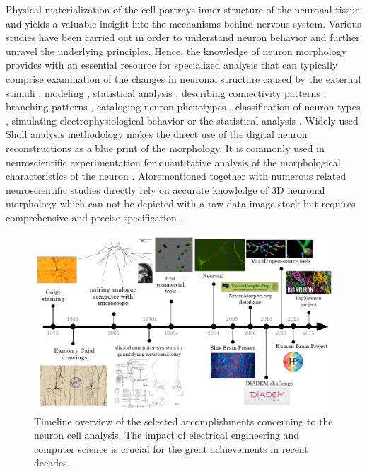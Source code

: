 Physical materialization of the cell portrays inner structure of the neuronal tissue and yields a valuable insight into the mechanisms behind nervous system. Various studies have been carried out in order to understand neuron behavior and further unravel the underlying principles. Hence, the knowledge of neuron morphology provides with an essential resource for specialized analysis that can typically comprise examination of the changes in neuronal structure caused by the external stimuli \cite{gomez2007immobilized, koppes2011neurite}, modeling \cite{ascoli2001computer}, statistical analysis \cite{polavaram2014statistical}, describing connectivity patterns \cite{jiang2015principles}, branching patterns \cite{vallotton2007automated}, cataloging neuron phenotypes \cite{defelipe2013new}, classification of neuron types \cite{armananzas2015towards}, simulating electrophysiological behavior or the statistical analysis \cite{samsonovich2005statistical}. Widely used Sholl analysis methodology \cite{sholl1953dendritic} makes the direct use of the digital neuron reconstructions as a blue print of the morphology. It is commonly used in neuroscientific experimentation for quantitative analysis of the morphological characteristics of the neuron \cite{garcia2014new}. Aforementioned together with numerous related neuroscientific studies directly rely on accurate knowledge of 3D neuronal morphology which can not be depicted with a raw data image stack but requires comprehensive and precise specification \cite{parekh2013neuronal}.

\begin{figure}
	\begin{center}
		\includegraphics[width=\textwidth]{fig1}
	\end{center}
	\caption{Timeline overview of the selected accomplishments concerning to the neuron cell analysis. The impact of electrical engineering and computer science is crucial for the great achievements in recent decades.}
	\label{fig1}
\end{figure}

